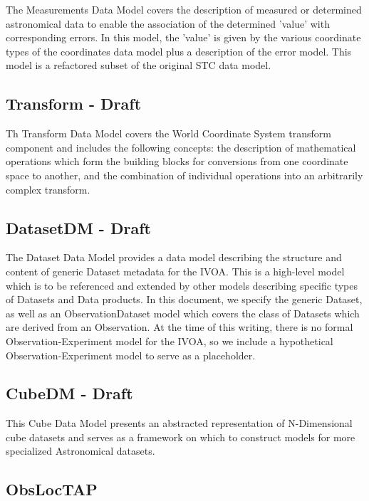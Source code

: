 \documentclass[11pt,a4paper]{ivoa}
\begin{document}
The Measurements Data Model covers the description of measured or determined astronomical data 
to enable the association of the determined ’value’ with corresponding errors. In this model, 
the ’value’ is given by the various coordinate types of the coordinates data model plus a 
description of the error model.  This model is a refactored subset of the original STC data model.

\subsection{Transform - Draft}

Th Transform Data Model covers the World Coordinate System transform component and includes 
the following concepts: the description of mathematical operations which form the building 
blocks for conversions from one coordinate space to another, and the combination of individual 
operations into an arbitrarily complex transform.
 
\subsection{DatasetDM - Draft}

The Dataset Data Model provides a data model describing the structure and content of generic 
Dataset metadata for the IVOA. This is a high-level model which is to be referenced and 
extended by other models describing specific types of Datasets and Data products. In 
this document, we specify the generic Dataset, as well as an ObservationDataset model 
which covers the class of Datasets which are derived from an Observation. At the time of 
this writing, there is no formal Observation-Experiment model for the IVOA, so we include 
a hypothetical Observation-Experiment model to serve as a placeholder. 

\subsection{CubeDM - Draft}

This Cube Data Model presents an abstracted representation of N-Dimensional cube datasets and 
serves as a framework on which to construct models for more specialized Astronomical datasets. 

\subsection{ObsLocTAP} 
\end{document}
